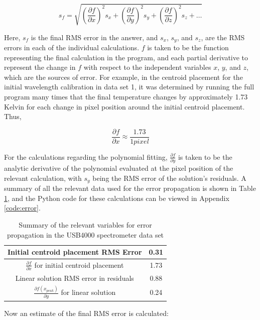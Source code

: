 \documentclass{article}
\begin{document}
\begin{equation}
  s_f = \sqrt{(\frac{\partial f}{\partial x})^2 s_x + (\frac{\partial f}{\partial y})^2 s_y + (\frac{\partial f}{\partial z})^2 s_z + \dots}
\end{equation} 


Here, $s_f$ is the final RMS error in the answer, and $s_x$, $s_y$, and $s_z$, are the RMS errors in each of the individual calculations. $f$ is taken to be the function representing the final calculation in the program, and each partial derivative to represent the change in $f$ with respect to the 
independent variables $x$, $y$, and $z$, which are the sources of error. For example, in the centroid placement for the initial wavelength calibration in data set 1, it was determined by running the full program many times that the final temperature changes by approximately 1.73 Kelvin for each 
change in pixel position around the initial centroid placement. Thus,  

\begin{equation}
  \frac{\partial f}{\partial x} \approx \frac{1.73}{1 pixel}
\end{equation}

\noindent
For the calculations regarding the polynomial fitting, $\frac{\partial f}{\partial y}$ is taken to be the analytic derivative of the polynomial evaluated at the pixel position of the 
relevant calculation, with $s_y$ being the RMS error of the solution's residuals. A summary of all the relevant data used for the error propagation is shown in Table \ref{tab:q1_errors}, and the 
Python code for these calculations can be viewed in Appendix \ref{code:error}.

\begin{table}[h]
  \centering
  \begin{tabular}{|c|c|}
  \hline
  Initial centroid placement RMS Error &  0.31 \\ \hline
  $\frac{\partial f}{\partial x}$ for initial centroid placement & 1.73 \\ \hline
  Linear solution RMS error in residuals & 0.88 \\ \hline
  $\frac{\partial f(x_{peak})}{\partial y}$ for linear solution & 0.24 \\ \hline
  \end{tabular}
  \caption{Summary of the relevant variables for error propagation in the USB4000 spectrometer data set}
  \label{tab:q1_errors}
\end{table}

\noindent
Now an estimate of the final RMS error is calculated:
\end{document}
